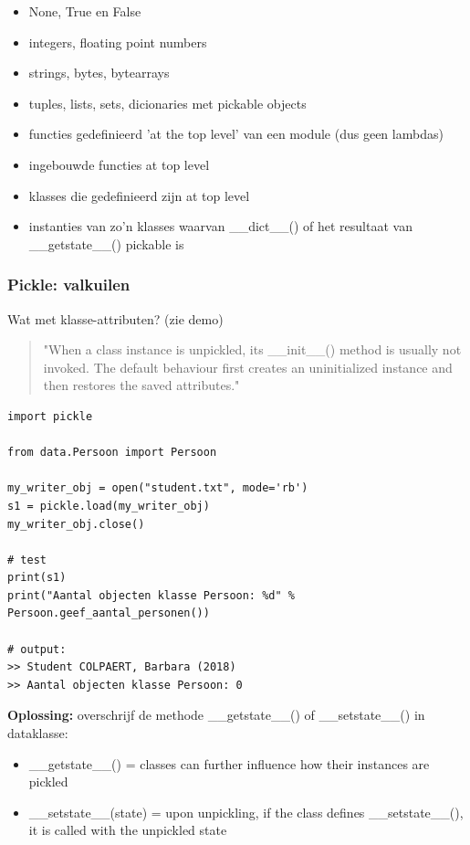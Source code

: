 \documentclass{article}
\begin{document}
\begin{itemize}
    \item None, True en False
    \item integers, floating point numbers
    \item strings, bytes, bytearrays
    \item tuples, lists, sets, dicionaries met pickable objects
    \item functies gedefinieerd 'at the top level' van een module (dus geen lambdas)
    \item ingebouwde functies at top level
    \item klasses die gedefinieerd zijn at top level
    \item instanties van zo'n klasses waarvan \_\_dict\_\_() of het resultaat van \_\_getstate\_\_() pickable is
\end{itemize}

\subsubsection{Pickle: valkuilen}

Wat met klasse-attributen? (zie demo)

\begin{quotation}
"When a class instance is unpickled, its \_\_init\_\_() method is usually not
invoked. The default behaviour first creates an uninitialized instance
and then restores the saved attributes."
\end{quotation}

\begin{verbatim}
import pickle

from data.Persoon import Persoon

my_writer_obj = open("student.txt", mode='rb')
s1 = pickle.load(my_writer_obj)
my_writer_obj.close()

# test
print(s1)
print("Aantal objecten klasse Persoon: %d" % Persoon.geef_aantal_personen())

# output:
>> Student COLPAERT, Barbara (2018)
>> Aantal objecten klasse Persoon: 0
\end{verbatim}

\textbf{Oplossing:} overschrijf de methode \_\_getstate\_\_() of \_\_setstate\_\_() in dataklasse:

\begin{itemize}
    \item \_\_getstate\_\_() = classes can further influence how their instances are pickled 
    \item \_\_setstate\_\_(state) = upon unpickling, if the class defines \_\_setstate\_\_(), it is called with the unpickled state
\end{itemize}
\end{document}
